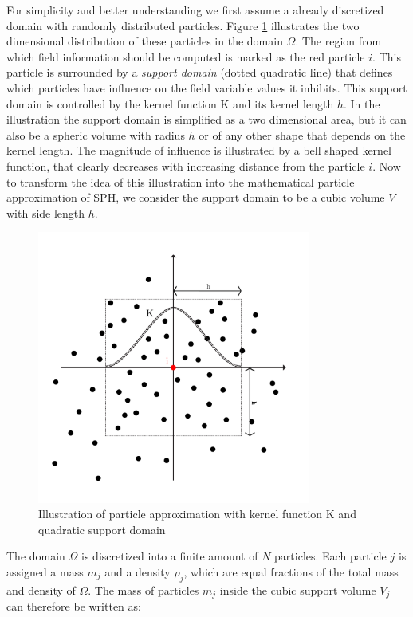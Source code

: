 For simplicity and better understanding we first assume a already discretized domain with randomly distributed particles. Figure \ref{fig:sph_par_approx_domain} illustrates the two dimensional distribution of these particles in the domain $\Omega$. The region from which field information should be computed is marked as the red particle $i$. This particle is surrounded by a \emph{support domain} (dotted quadratic line) that defines which particles have influence on the field variable values it inhibits. This support domain is controlled by the kernel function K and its kernel length $h$. In the illustration the support domain is simplified as a two dimensional area, but it can also be a spheric volume with radius $h$ or of any other shape that depends on the kernel length. The magnitude of influence is illustrated by
a bell shaped kernel function, that clearly decreases with increasing distance from the particle $i$. Now to transform the idea of this illustration into the mathematical particle approximation of SPH, we consider the support domain to be a cubic volume $V$  with side length $h$.


\begin{figure}[htb]
\centering
\includegraphics[width=0.8\textwidth]{Figures/sph_particle_domain.pdf}
\caption{Illustration of particle approximation with kernel function K and quadratic support domain}
\label{fig:sph_par_approx_domain}
\end{figure}

The domain $\Omega$ is discretized into a finite amount of $N$ particles. Each particle $j$ is assigned a mass $m_{j}$ and a density $\rho_{j}$, which are equal fractions of the total mass and density of $\Omega$. The mass of particles $m_{j}$ inside the cubic support volume $V_{j}$ can therefore be written as:

